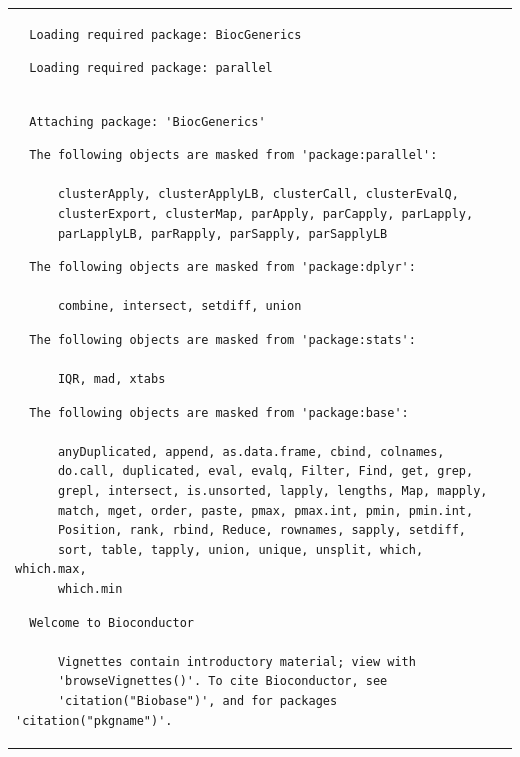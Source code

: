 \documentclass[12pt,twoside]{reedthesis}
\begin{document}
\begin{longtable}[c]{@{}lr@{}}
  \begin{verbatim}
  Loading required package: BiocGenerics
  \end{verbatim}
  
  \begin{verbatim}
  Loading required package: parallel
  \end{verbatim}
  
  \begin{verbatim}
  
  Attaching package: 'BiocGenerics'
  \end{verbatim}
  
  \begin{verbatim}
  The following objects are masked from 'package:parallel':
  
      clusterApply, clusterApplyLB, clusterCall, clusterEvalQ,
      clusterExport, clusterMap, parApply, parCapply, parLapply,
      parLapplyLB, parRapply, parSapply, parSapplyLB
  \end{verbatim}
  
  \begin{verbatim}
  The following objects are masked from 'package:dplyr':
  
      combine, intersect, setdiff, union
  \end{verbatim}
  
  \begin{verbatim}
  The following objects are masked from 'package:stats':
  
      IQR, mad, xtabs
  \end{verbatim}
  
  \begin{verbatim}
  The following objects are masked from 'package:base':
  
      anyDuplicated, append, as.data.frame, cbind, colnames,
      do.call, duplicated, eval, evalq, Filter, Find, get, grep,
      grepl, intersect, is.unsorted, lapply, lengths, Map, mapply,
      match, mget, order, paste, pmax, pmax.int, pmin, pmin.int,
      Position, rank, rbind, Reduce, rownames, sapply, setdiff,
      sort, table, tapply, union, unique, unsplit, which, which.max,
      which.min
  \end{verbatim}
  
  \begin{verbatim}
  Welcome to Bioconductor
  
      Vignettes contain introductory material; view with
      'browseVignettes()'. To cite Bioconductor, see
      'citation("Biobase")', and for packages 'citation("pkgname")'.
  \end{verbatim}
  

\end{longtable}
\end{document}
